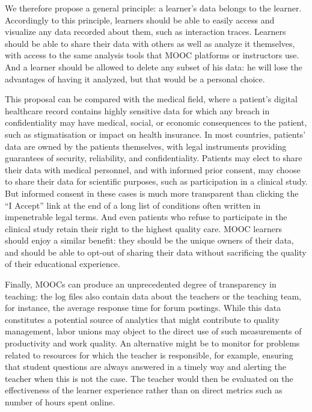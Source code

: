 We therefore
propose a general principle: a learner's data belongs to the
learner.  Accordingly to this principle,  learners should be able to
easily access and visualize any data recorded about them, 
such as
interaction traces.
Learners should be able to share their data with others as well as
analyze it themselves, with access to the same analysis tools that MOOC
platforms or instructors use.
And a learner should be allowed to delete any
subset
of his data: he will lose the advantages
of having it analyzed, but that would be a personal choice.

This proposal can be compared with the medical field, where a patient's
digital healthcare record contains highly sensitive data for which any
breach in confidentiality may have medical, social, or economic
consequences to the patient,
such as stigmatisation or impact on health insurance. 
In most countries, patients' data are owned by the
patients themselves, with legal instruments providing guarantees of
security, reliability, and confidentiality. Patients may elect to share
their data with  medical personnel, and with informed prior consent, may
choose to share their data for scientific purposes,
such as participation in a clinical study. But informed consent in these
cases is much more transparent than clicking the ``I Accept'' link at
the end of a long list of conditions often written in impenetrable legal
terms. 
And even patients who refuse to participate in the
clinical study retain their right to the highest quality care.
MOOC learners should enjoy a similar benefit: they
should be the unique owners of their data, and should be able to
opt-out of sharing their data without sacrificing the quality
of their educational experience.

Finally, MOOCs can
produce an unprecedented degree of transparency in teaching:  the log
files also contain data about the teachers or the 
teaching team, for instance, the average response time for forum
postings.  While this data constitutes a potential source of
analytics that might contribute to quality management,
labor unions may object to the direct use of such
measurements of productivity and work quality. An alternative might be
to monitor for problems related to resources for which the teacher is
responsible, for example, ensuring that student questions are always
answered in a timely way and 
alerting the teacher when this is not the case.  The teacher would then
be evaluated on the effectiveness of the learner experience rather than on
direct metrics such as number of hours spent online.

